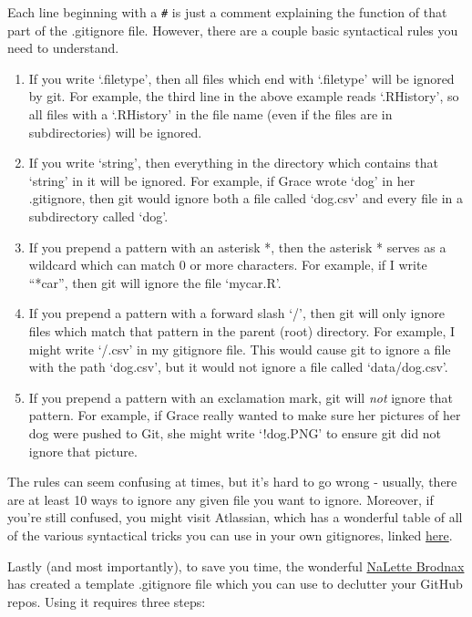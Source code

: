 \documentclass[
]{book}
\begin{document}
Each line beginning with a \texttt{\#} is just a comment explaining the function of that part of the .gitignore file. However, there are a couple basic syntactical rules you need to understand.

\begin{enumerate}
\def\labelenumi{\arabic{enumi}.}
\item
  If you write `.filetype', then all files which end with `.filetype' will be ignored by git. For example, the third line in the above example reads `.RHistory', so all files with a `.RHistory' in the file name (even if the files are in subdirectories) will be ignored.
\item
  If you write `string', then everything in the directory which contains that `string' in it will be ignored. For example, if Grace wrote `dog' in her .gitignore, then git would ignore both a file called `dog.csv' and every file in a subdirectory called `dog'.
\item
  If you prepend a pattern with an asterisk *, then the asterisk * serves as a wildcard which can match 0 or more characters. For example, if I write ``*car'', then git will ignore the file `mycar.R'.
\item
  If you prepend a pattern with a forward slash `/', then git will only ignore files which match that pattern in the parent (root) directory. For example, I might write `/.csv' in my gitignore file. This would cause git to ignore a file with the path `dog.csv', but it would not ignore a file called `data/dog.csv'.
\item
  If you prepend a pattern with an exclamation mark, git will \emph{not} ignore that pattern. For example, if Grace really wanted to make sure her pictures of her dog were pushed to Git, she might write `!dog.PNG' to ensure git did not ignore that picture.
\end{enumerate}

The rules can seem confusing at times, but it's hard to go wrong - usually, there are at least 10 ways to ignore any given file you want to ignore. Moreover, if you're still confused, you might visit Atlassian, which has a wonderful table of all of the various syntactical tricks you can use in your own gitignores, linked \href{https://www.atlassian.com/git/tutorials/gitignore}{here}.

Lastly (and most importantly), to save you time, the wonderful \href{https://www.iq.harvard.edu/people/nalette-brodnax}{NaLette Brodnax} has created a template .gitignore file which you can use to declutter your GitHub repos. Using it requires three steps:
\end{document}
